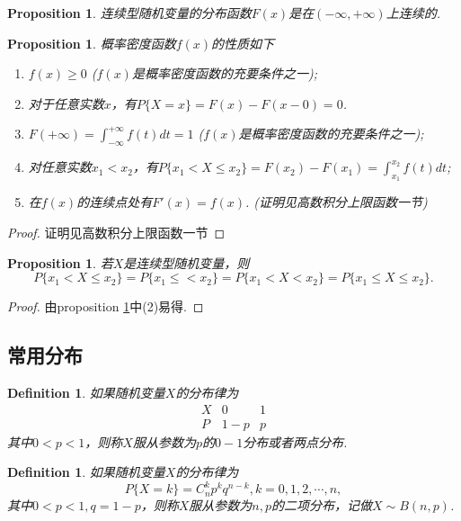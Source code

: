 \documentclass{article}
\newtheorem{proposition}[theorem]{Proposition}
\newtheorem{definition}[theorem]{Definition}
\begin{document}
\begin{proposition}
\rm 连续型随机变量的分布函数$F(x)$是在$(-\infty,+\infty)$上连续的.
\end{proposition}

\begin{proposition}\label{probability-density-func: prop1}
\rm 概率密度函数$f(x)$的性质如下
\begin{enumerate}
	\item $f(x) \geq 0$ ({\color{red}$f(x)$是概率密度函数的充要条件之一});
	\item 对于任意实数$x$，有$P\{X=x\} = F(x)-F(x-0) = 0$.
	\item $F(+\infty) = \int_{-\infty}^{+\infty} f(t)dt = 1$ ({\color{red}$f(x)$是概率密度函数的充要条件之一});
	\item 对任意实数$x_1 < x_2$，有$P\{x_1 < X \leq x_2 \} = F(x_2)-F(x_1) = \int_{x_1}^{x_2} f(t)dt$;
	\item 在$f(x)$的连续点处有$F'(x) = f(x)$. (证明见高数积分上限函数一节) 
\end{enumerate}
\end{proposition}

\begin{proof}
证明见高数积分上限函数一节
\end{proof}

\begin{proposition}
\rm 若$X$是连续型随机变量，则
$$
P\{x_1 < X \leq x_2\} = P\{x_1 \leq  < x_2\} = P\{x_1 < X < x_2\} = P\{x_1 \leq  X \leq x_2\}.
$$
\end{proposition}

\begin{proof}
由proposition \ref{probability-density-func: prop1}中(2)易得. 
\end{proof}


\subsection{常用分布}

\begin{definition}
\rm 如果随机变量$X$的分布律为
$$
\begin{array}{c|cc}
X & 0 & 1\\
\hline
P & 1-p & p
\end{array}
$$
其中$0 < p < 1$，则称$X$服从参数为$p$的$0 - 1$分布或者两点分布.
\end{definition}

\begin{definition}
\rm 如果随机变量$X$的分布律为
$$
P\{X = k\} = C_n^kp^kq^{n-k}, k = 0,1,2,\cdots,n,
$$
其中$0 < p < 1, q= 1- p$，则称$X$服从参数为$n,p$的二项分布，记做$X \sim B(n,p)$.
\end{definition}
\end{document}
